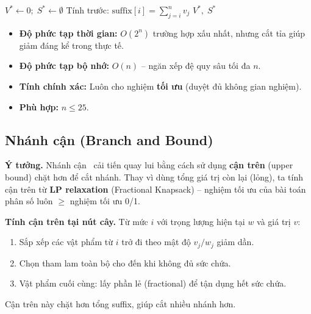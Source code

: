 \documentclass[fontsize=13pt,a4paper]{report}
\begin{document}
\begin{algorithm}[H]
\caption{Quay lui cho 0/1 Knapsack}
\label{alg:backtracking}
$V^* \leftarrow 0;\; S^* \leftarrow \emptyset$\;
Tính trước: $\text{suffix}[i] = \sum_{j=i}^{n} v_j$ 
\;
\Return $V^*,\; S^*$\;
\end{algorithm}

\begin{itemize}[noitemsep]
    \item \textbf{Độ phức tạp thời gian:} $O(2^n)$ trường hợp xấu nhất, nhưng cắt tỉa giúp giảm đáng kể trong thực tế.
    \item \textbf{Độ phức tạp bộ nhớ:} $O(n)$ -- ngăn xếp đệ quy sâu tối đa $n$.
    \item \textbf{Tính chính xác:} Luôn cho nghiệm \textbf{tối ưu} (duyệt đủ không gian nghiệm).
    \item \textbf{Phù hợp:} $n \leq 25$.
\end{itemize}


\subsection{Nhánh cận (Branch and Bound)}

\textbf{Ý tưởng.} Nhánh cận~\cite{land1960automatic} cải tiến quay lui bằng cách sử dụng \textbf{cận trên} (upper bound) chặt hơn để cắt nhánh. Thay vì dùng tổng giá trị còn lại (lỏng), ta tính cận trên từ \textbf{LP relaxation} (Fractional Knapsack) -- nghiệm tối ưu của bài toán phân số luôn $\geq$ nghiệm tối ưu 0/1.

\textbf{Tính cận trên tại nút cây.} Từ mức $i$ với trọng lượng hiện tại $w$ và giá trị $v$:
\begin{enumerate}[noitemsep]
    \item Sắp xếp các vật phẩm từ $i$ trở đi theo mật độ $v_j/w_j$ giảm dần.
    \item Chọn tham lam toàn bộ cho đến khi không đủ sức chứa.
    \item Vật phẩm cuối cùng: lấy phần lẻ (fractional) để tận dụng hết sức chứa.
\end{enumerate}
Cận trên này chặt hơn tổng suffix, giúp cắt nhiều nhánh hơn.
\end{document}
